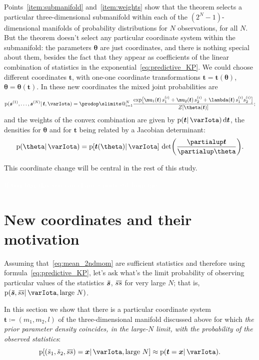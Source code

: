 \documentclass[\ifafour a4paper,12pt,\else a5paper,10pt,\fi%
onecolumn,oneside,article,%
british%
]{memoir}
\makeatletter
\theoremstyle{remark}
\theoremstyle{innote}
\def\prod{\DOTSI\prodop\slimits@}
\newcommand*{\de}{\partialup}%
\newcommand*{\di}{\mathrm{d}}%
\newcommand*{\defd}{\coloneqq}
\newcommand*{\pf}{\mathrm{p}}%
\renewcommand*{\|}{\mathpunct{|}}
\newcommand*{\widebar}[1]{{\mkern1.5mu\skew{2}\overline{\mkern-1.5mu#1\mkern-1.5mu}\mkern 1.5mu}}
\newcommand*{\yI}{\varIota}
\newcommand*{\ys}{\bm{s}}
\newcommand*{\yso}[1]{\ys^{(#1)}}
\newcommand*{\ysso}[1]{s^{(#1)}}
\newcommand*{\la}{\lambda}
\newcommand*{\yth}{\bm{\theta}}
\newcommand*{\yt}{\bm{t}}
\newcommand*{\yav}{\widebar{\bm{s}}}
\newcommand*{\yavv}{\widebar{s}}
\newcommand*{\ycv}{\widebar{ss}}
\makeatother
\begin{document}
Points~\ref{item:submanifold} and~\ref{item:weights} show that the theorem
selects a particular three-dimensional submanifold within each of the
$(2^N-1)$-dimensional manifolds of probability distributions for $N$
observations, for all $N$. But the theorem doesn't select any particular
coordinate system within the submanifold: the parameters $\yth$ are just
coordinates, and there is nothing special about them, besides
the fact that they appear as coefficients of the linear combination of
statistics in the exponential~\eqref{eq:predictive_KP}. We could choose
different coordinates $\yt$, with one-one coordinate transformations
$\yt=\yt(\yth)$, $\yth=\yth(\yt)$. In these new coordinates the mixed joint
probabilities are
\begin{equation}
  \label{eq:extreme_probs_newcoords}
  \pf(\yso{1}, \dotsc, \yso{N} \|\yt, \yI ) =
    \prod_{i=1}^{N}
  \frac{  \exp\bigl[
    \mu_1(\yt)\, \ysso{i}_1 + \mu_2(\yt)\, \ysso{i}_2 +
    \la(\yt)\, \ysso{i}_1 \ysso{i}_2
    \bigr] }{Z[\yth(\yt)]};
\end{equation}
and the weights of the convex combination are given by
$\pf(\yt \|\yI) \, \di\yt$, the densities for $\yth$ and for $\yt$ being
related by a Jacobian determinant:
\begin{equation}
  \label{eq:jacobian}
  \pf(\yth \|\yI) = \pf[\yt(\yth) \| \yI]\,
  \det\biggl( \frac{\de\yt}{\de\yth}\biggr).
\end{equation}

This coordinate change will be central in the rest of this study.

\textcolor{white}{If you find this you can claim a postcard from me.}

\section{New coordinates and their motivation}
\label{sec:new_coords}

Assuming that~\eqref{eq:mean_2ndmom} are sufficient statistics and
therefore using formula~\eqref{eq:predictive_KP}, let's ask what's the
limit probability of observing particular values of the statistics $\yav$,
$\ycv$ for very large $N$; that is, $\pf(\yav,\ycv \| \yI, \text{large } N)$.

In this section we show that there is a particular coordinate system
$\yt \defd (m_1, m_2, l)$ of the three-dimensional manifold discussed above
for which \emph{the prior parameter density coincides, in the large-$N$
  limit, with the probability of the observed statistics}:
\begin{equation}
  \label{eq:special_parameter_is_statistics}
  \pf[(\yavv_1,\yavv_2,\ycv)=\bm{x} \| \yI, \text{large $N$}]
  \approx \pf(\yt=\bm{x} \|\yI).
\end{equation}
\end{document}
